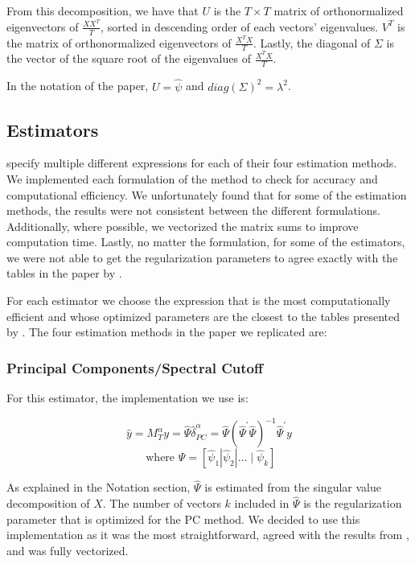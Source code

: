 From this decomposition, we have that $U$ is the $T \times T$ matrix of orthonormalized eigenvectors of $\frac{X X^{T}}{T}$, sorted in descending order of each vectors' eigenvalues. $V^{T}$ is the matrix of orthonormalized eigenvectors of $\frac{X^{T} X}{T}$. Lastly, the diagonal of $\Sigma$ is the vector of the square root of the eigenvalues of $\frac{X^{T} X}{T}$.

In the notation of the \citeauthor{carrasco2016sample} paper, $U = \hat{\psi}$ and $diag(\Sigma)^{2} = \lambda^{2}$.

\subsection{Estimators}

\citeauthor{carrasco2016sample} specify multiple different expressions for each of their four estimation methods. We implemented each formulation of the method to check for accuracy and computational efficiency. We unfortunately found that for some of the estimation methods, the results were not consistent between the different formulations. Additionally, where possible, we vectorized the matrix sums to improve computation time. Lastly, no matter the formulation, for some of the estimators, we were not able to get the regularization parameters to agree exactly with the tables in the paper by \citeauthor{carrasco2016sample}.


For each estimator we choose the expression that is the most computationally efficient and whose optimized parameters are the closest to the tables presented by \citeauthor{carrasco2016sample}. The four estimation methods in the paper we replicated are:

\subsubsection{Principal Components/Spectral Cutoff}

For this estimator, the implementation we use is:

\[\widehat{y} = M_{T}^{\alpha} y = \widehat{\Psi} \hat{\delta}_{PC}^{\alpha} = \widehat{\Psi} \left(\widehat{\Psi}^{\prime} \widehat{\Psi}\right)^{-1} \widehat{\Psi}^{\prime} y\]
\[\text{ where } \widehat{\Psi} = \left[\widehat{\psi}_{1}\left|\widehat{\psi}_{2}\right| \ldots \mid \widehat{\psi}_{k}\right]\]

As explained in the Notation section, $\hat{\Psi}$ is estimated from the singular value decomposition of $X$. The number of vectors $k$ included in $\hat{\Psi}$ is the regularization parameter that is optimized for the PC method. We decided to use this implementation as it was the most straightforward, agreed with the results from \citeauthor{carrasco2016sample}, and was fully vectorized.

